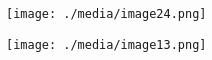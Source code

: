 \documentclass[12pt]{article}
\renewcommand{\_}{\kern-1.5pt\textunderscore\kern-1.5pt}
\begin{document}
\par




\begin{figure}[H]
	\begin{Center}
		\texttt{[image: ./media/image24.png]}
	\end{Center}
\end{figure}



\par


\vspace{\baselineskip}



\begin{figure}[H]
	\begin{Center}
		\texttt{[image: ./media/image13.png]}
	\end{Center}
\end{figure}



\par


\vspace{\baselineskip}

\vspace{\baselineskip}

\vspace{\baselineskip}

\vspace{\baselineskip}

\vspace{\baselineskip}

\vspace{\baselineskip}

\vspace{\baselineskip}

\vspace{\baselineskip}

\vspace{\baselineskip}

\vspace{\baselineskip}

\vspace{\baselineskip}
\end{document}
